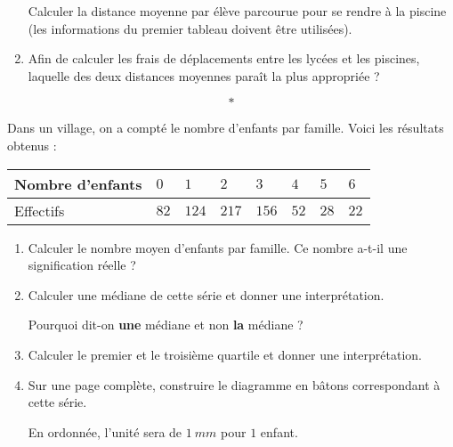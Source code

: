 \documentclass[10pt,openright,twoside,french]{book}
\begin{document}
\begin{enumerate}
    Calculer la distance moyenne par élève parcourue pour se rendre à la piscine (les informations du premier tableau doivent être utilisées).\medskip

    \item Afin de calculer les frais de déplacements entre les lycées et les piscines, laquelle des deux distances moyennes paraît la plus appropriée ?
\end{enumerate}\[*\]

\exo Dans un village, on a compté le nombre d'enfants par famille. Voici les résultats obtenus :
\begin{center}
    \begin{tabularx}{0.65\linewidth}{|m{3cm}|*{7}{X|}}
        \hline
            Nombre d'enfants & $0$ & $1$ & $2$ & $3$ & $4$ & $5$ & $6$ \\
        \hline
            Effectifs & $82$ & $124$ & $217$ & $156$ & $52$ & $28$ & $22$ \\
        \hline
    \end{tabularx}
\end{center}

\begin{enumerate}
    \item Calculer le nombre moyen d'enfants par famille. Ce nombre a-t-il une signification réelle ?
    \item Calculer une médiane de cette série et donner une interprétation.\par Pourquoi dit-on \textbf{une} médiane et non \textbf{la} médiane ?
    \item Calculer le premier et le troisième quartile et donner une interprétation.
    \item Sur une page complète, construire le diagramme en bâtons correspondant à cette série.\par En ordonnée, l'unité sera de $1~mm$ pour $1$ enfant.
\end{enumerate}
\end{document}
